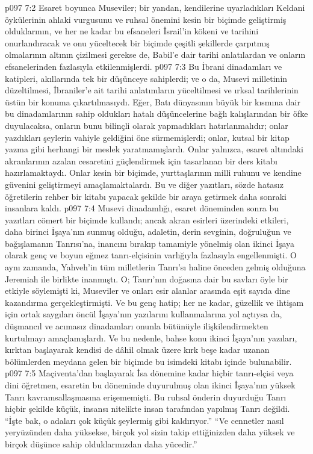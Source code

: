 \vs p097 7:2 Esaret boyunca Museviler; bir yandan, kendilerine uyarladıkları Keldani öykülerinin ahlaki vurgusunu ve ruhsal önemini kesin bir biçimde geliştirmiş olduklarının, ve her ne kadar bu efsaneleri İsrail’in kökeni ve tarihini onurlandıracak ve onu yüceltecek bir biçimde çeşitli şekillerde çarpıtmış olmalarının altının çizilmesi gerekse de, Babil’e dair tarihi anlatılardan ve onların efsanelerinden fazlasıyla etkilenmişlerdi.
\vs p097 7:3 Bu İbrani dinadamları ve katipleri, akıllarında tek bir düşünceye sahiplerdi; ve o da, Musevi milletinin düzeltilmesi, İbraniler’e ait tarihi anlatımların yüceltilmesi ve ırksal tarihlerinin üstün bir konuma çıkartılmasıydı. Eğer, Batı dünyasının büyük bir kısmına dair bu dinadamlarının sahip oldukları hatalı düşüncelerine bağlı kalışlarından bir öfke duyulacaksa, onların bunu bilinçli olarak yapmadıkları hatırlanmalıdır; onlar yazdıkları şeylerin vahiyle geldiğini öne sürmemişlerdi; onlar, kutsal bir kitap yazma gibi herhangi bir meslek yaratmamışlardı. Onlar yalnızca, esaret altındaki akranlarının azalan cesaretini güçlendirmek için tasarlanan bir ders kitabı hazırlamaktaydı. Onlar kesin bir biçimde, yurttaşlarının milli ruhunu ve kendine güvenini geliştirmeyi amaçlamaktalardı. Bu ve diğer yazıtları, sözde hatasız öğretilerin rehber bir kitabı yapacak şekilde bir araya getirmek daha sonraki insanlara kaldı.
\vs p097 7:4 Musevi dinadamlığı, esaret döneminden sonra bu yazıtları cömert bir biçimde kullandı; ancak akran esirleri üzerindeki etkileri, daha birinci İşaya’nın sunmuş olduğu, adaletin, derin sevginin, doğruluğun ve bağışlamanın Tanrısı’na, inancını bırakıp tamamiyle yönelmiş olan ikinci İşaya olarak genç ve boyun eğmez tanrı\hyp{}elçisinin varlığıyla fazlasıyla engellenmişti. O aynı zamanda, Yahveh’in tüm milletlerin Tanrı’sı haline önceden gelmiş olduğuna Jeremiah ile birlikte inanmıştı. O; Tanrı’nın doğasına dair bu savları öyle bir etkiyle söylemişti ki, Museviler ve onları esir alanlar arasında eşit sayıda dine kazandırma gerçekleştirmişti. Ve bu genç hatip; her ne kadar, güzellik ve ihtişam için ortak saygıları öncül İşaya’nın yazılarını kullanmalarına yol açtıysa da, düşmancıl ve acımasız dinadamları onunla bütünüyle ilişkilendirmekten kurtulmayı amaçlamışlardı. Ve bu nedenle, bahse konu ikinci İşaya’nın yazıları, kırktan başlayarak kendisi de dâhil olmak üzere kırk beşe kadar uzanan bölümlerden meydana gelen bir biçimde bu isimdeki kitabı içinde bulunabilir.
\vs p097 7:5 Maçiventa’dan başlayarak İsa dönemine kadar hiçbir tanrı\hyp{}elçisi veya dini öğretmen, esaretin bu döneminde duyurulmuş olan ikinci İşaya’nın yüksek Tanrı kavramsallaşmasına erişememişti. Bu ruhsal önderin duyurduğu Tanrı hiçbir şekilde küçük, insansı nitelikte insan tarafından yapılmış Tanrı değildi. “İşte bak, o adaları çok küçük şeylermiş gibi kaldırıyor.” “Ve cennetler nasıl yeryüzünden daha yüksekse, birçok yol sizin takip ettiğinizden daha yüksek ve birçok düşünce sahip olduklarınızdan daha yücedir.”

